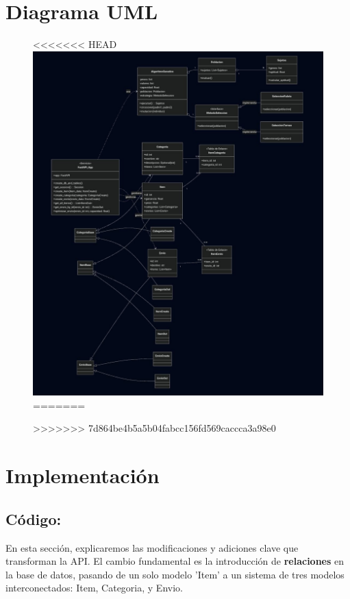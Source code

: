 \documentclass[12pt]{article}
\begin{document}
\section{Diagrama UML}
\begin{figure}[H]
    \centering
<<<<<<< HEAD
    \includegraphics[width=1\textwidth]{Imagenes/diagramauml.jpeg}
=======
    
>>>>>>> 7d864be4b5a5b04fabcc156fd569caccca3a98e0
\end{figure}


\section{Implementación}
\subsection*{Código:}
En esta sección, explicaremos las modificaciones y adiciones clave que transforman la API. El cambio fundamental es la introducción de \textbf{relaciones} en la base de datos, pasando de un solo modelo 'Item' a un sistema de tres modelos interconectados: Item, Categoria, y Envio.
\end{document}
